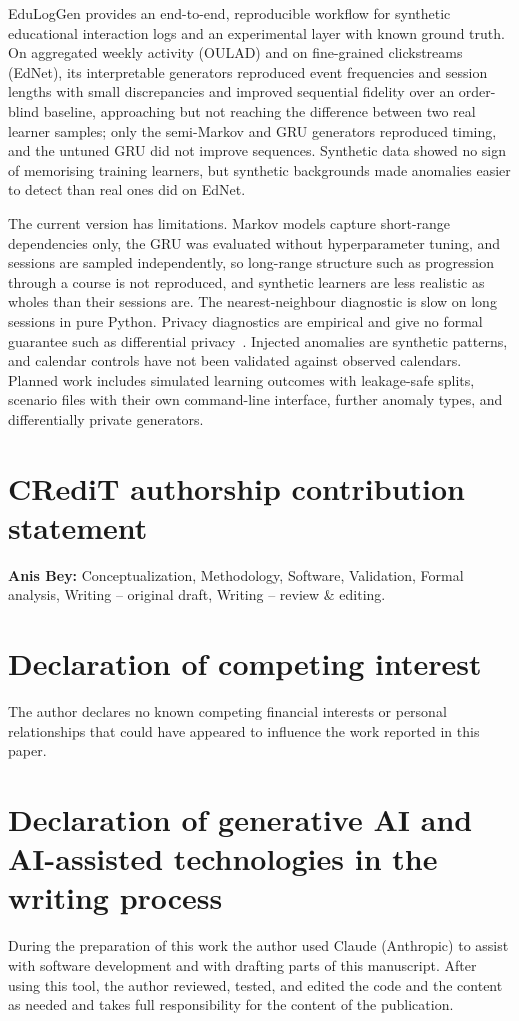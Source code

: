 \documentclass[preprint,12pt]{elsarticle}
\begin{document}
EduLogGen provides an end-to-end, reproducible workflow for synthetic
educational interaction logs and an experimental layer with known ground
truth. On aggregated weekly activity (OULAD) and on fine-grained clickstreams
(EdNet), its interpretable generators reproduced event frequencies and
session lengths with small discrepancies and improved sequential fidelity
over an order-blind baseline, approaching but not reaching the difference
between two real learner samples; only the semi-Markov and GRU generators
reproduced timing, and the untuned GRU did not improve sequences. Synthetic
data showed no sign of memorising training learners, but
synthetic backgrounds made anomalies easier to detect than real ones did on
EdNet.

The current version has limitations. Markov models capture short-range
dependencies only, the GRU was evaluated without hyperparameter tuning, and
sessions are sampled independently, so long-range
structure such as progression through a course is not reproduced, and
synthetic learners are less realistic as wholes than their sessions are. The
nearest-neighbour diagnostic is slow on long sessions in pure Python. Privacy
diagnostics are empirical and give no formal guarantee such as differential
privacy~\cite{dwork2014dp}. Injected anomalies are synthetic patterns, and
calendar controls have not been validated against observed calendars.
Planned work includes simulated learning outcomes with leakage-safe splits,
scenario files with their own command-line interface, further anomaly types,
and differentially private generators.

\section*{CRediT authorship contribution statement}
\textbf{Anis Bey:} Conceptualization, Methodology, Software, Validation,
Formal analysis, Writing -- original draft, Writing -- review \& editing.

\section*{Declaration of competing interest}
The author declares no known competing financial interests or personal
relationships that could have appeared to influence the work reported in
this paper.

\section*{Declaration of generative AI and AI-assisted technologies in the writing process}
During the preparation of this work the author used Claude (Anthropic) to
assist with software development and with drafting parts of this
manuscript. After using this tool, the author reviewed, tested, and edited
the code and the content as needed and takes full responsibility for the
content of the publication.
\end{document}

